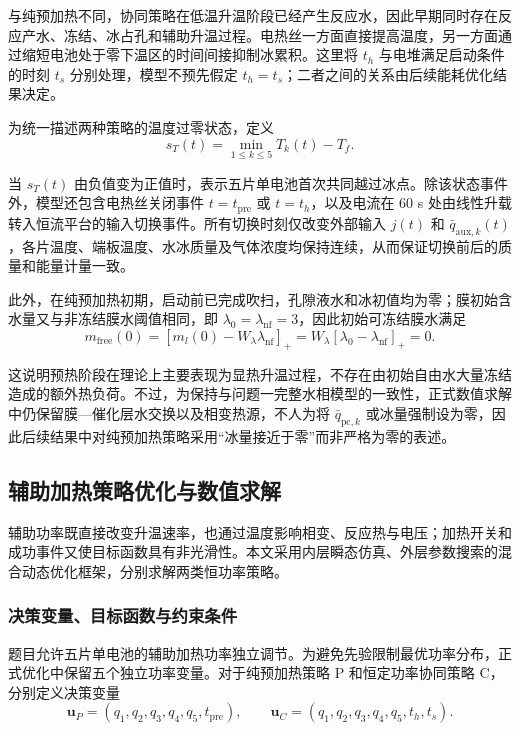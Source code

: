 \documentclass[bwprint]{gmcmthesis}
\numberwithin{equation}{section}
\numberwithin{figure}{section}
\begin{document}
 与纯预加热不同，协同策略在低温升温阶段已经产生反应水，因此早期同时存在反应产水、冻结、冰占孔和辅助升温过程。电热丝一方面直接提高温度，另一方面通过缩短电池处于零下温区的时间间接抑制冰累积。这里将 \(t_h\) 与电堆满足启动条件的时刻 \(t_s\) 分别处理，模型不预先假定 \(t_h = t_s\)；二者之间的关系由后续能耗优化结果决定。

 为统一描述两种策略的温度过零状态，定义
\begin{equation}
s_T(t) = \min_{1 \leq k \leq 5} T_k(t)-T_f. \label{eq:src:6-23}
\end{equation}

 当 \(s_T(t)\) 由负值变为正值时，表示五片单电池首次共同越过冰点。除该状态事件外，模型还包含电热丝关闭事件 \(t = t_{\text{pre}}\) 或 \(t = t_h\)，以及电流在 60 s 处由线性升载转入恒流平台的输入切换事件。所有切换时刻仅改变外部输入 \(j(t)\) 和 \(\bar{q}_{\text{aux},k}(t)\)，各片温度、端板温度、水冰质量及气体浓度均保持连续，从而保证切换前后的质量和能量计量一致。

 此外，在纯预加热初期，启动前已完成吹扫，孔隙液水和冰初值均为零；膜初始含水量又与非冻结膜水阈值相同，即 \(\lambda_0 = \lambda_{\text{nf}} = 3\)，因此初始可冻结膜水满足
\begin{equation}
m_{\text{free}}(0) = [m_l(0) - W_\lambda \lambda_{\text{nf}}]_+ = W_\lambda [\lambda_0 - \lambda_{\text{nf}}]_+ = 0. \label{eq:src:6-24}
\end{equation}

 这说明预热阶段在理论上主要表现为显热升温过程，不存在由初始自由水大量冻结造成的额外热负荷。不过，为保持与问题一完整水相模型的一致性，正式数值求解中仍保留膜—催化层水交换以及相变热源，不人为将 \(\bar{q}_{\text{pc},k}\) 或冰量强制设为零，因此后续结果中对纯预加热策略采用“冰量接近于零”而非严格为零的表述。

\subsection{辅助加热策略优化与数值求解}
辅助功率既直接改变升温速率，也通过温度影响相变、反应热与电压；加热开关和成功事件又使目标函数具有非光滑性。本文采用内层瞬态仿真、外层参数搜索的混合动态优化框架，分别求解两类恒功率策略。

\subsubsection{决策变量、目标函数与约束条件}

 题目允许五片单电池的辅助加热功率独立调节。为避免先验限制最优功率分布，正式优化中保留五个独立功率变量。对于纯预加热策略 P 和恒定功率协同策略 C，分别定义决策变量
\begin{equation}
\boldsymbol{u}_P = (q_1, q_2, q_3, q_4, q_5, t_{\text{pre}}), \qquad \boldsymbol{u}_C = (q_1, q_2, q_3, q_4, q_5, t_h, t_s). \label{eq:src:6-25}
\end{equation}
\end{document}
